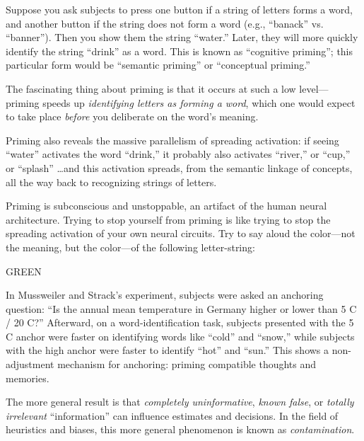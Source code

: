 
{
 Suppose you ask subjects to press one button if a string of
letters forms a word, and another button if the string does not form a
word (e.g., ``banack'' vs.
``banner''). Then you show them the
string ``water.'' Later, they will
more quickly identify the string
``drink'' as a word. This is known
as ``cognitive priming''; this
particular form would be ``semantic
priming'' or ``conceptual
priming.'' }

{
 The fascinating thing about priming is that it occurs at such a
low level---priming speeds up \textit{identifying letters as forming a
word}, which one would expect to take place \textit{before} you
deliberate on the word's meaning.}

{
 Priming also reveals the massive parallelism of spreading
activation: if seeing ``water''
activates the word ``drink,'' it
probably also activates ``river,''
or ``cup,'' or
``splash'' \ldots and this activation
spreads, from the semantic linkage of concepts, all the way back to
recognizing strings of letters.}

{
 Priming is subconscious and unstoppable, an artifact of the human
neural architecture. Trying to stop yourself from priming is like
trying to stop the spreading activation of your own neural circuits.
Try to say aloud the color---not the meaning, but the color---of the
following letter-string:\newline
}

{\centering
 GREEN
\par}


\bigskip

{
 In Mussweiler and Strack's experiment, subjects
were asked an anchoring question: ``Is the annual mean
temperature in Germany higher or lower than 5 C / 20
C?'' Afterward, on a
word-identification task, subjects presented with the 5 C anchor were
faster on identifying words like
``cold'' and
``snow,'' while subjects with the
high anchor were faster to identify
``hot'' and
``sun.'' This shows a non-adjustment
mechanism for anchoring: priming compatible thoughts and memories.}

{
 The more general result is that \textit{completely uninformative},
\textit{known false}, or \textit{totally irrelevant}
``information'' can influence
estimates and decisions. In the field of heuristics and biases, this
more general phenomenon is known as
\textit{contamination}.}

